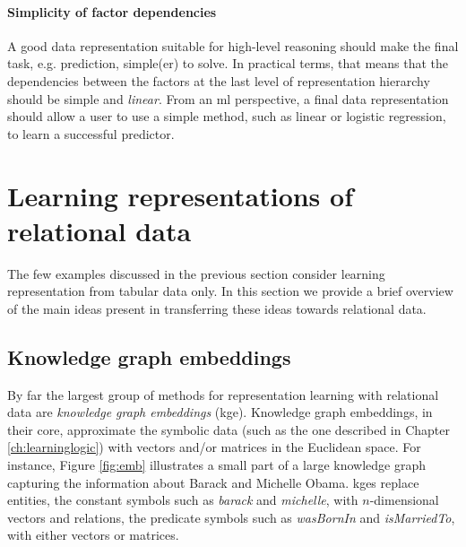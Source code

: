  



\paragraph{\textbf{Simplicity of factor dependencies}}
A good data representation suitable for high-level reasoning should make the final task, e.g. prediction, simple(er) to solve.
In practical terms, that means that the dependencies between the factors at the last level of representation hierarchy should be simple and \textit{linear}.
From an \gls{ml} perspective, a final data representation should allow a user to use a simple method, such as linear or logistic regression, to learn a successful predictor.












\section{Learning representations of relational data}


The few examples discussed in the previous section consider learning representation from tabular data only.
In this section we provide a brief overview of the main ideas present in transferring these ideas towards relational data.


\subsection{Knowledge graph embeddings}


By far the largest group of methods for representation learning with relational data are \textit{knowledge graph embeddings} (\gls{kge}).
Knowledge graph embeddings, in their core, approximate the symbolic data (such as the one described in Chapter \ref{ch:learninglogic}) with vectors and/or matrices in the Euclidean space.
For instance, Figure \ref{fig:emb} illustrates a small part of a large knowledge graph capturing the information about Barack and Michelle Obama.
\gls{kge}s replace entities, the constant symbols such as \textit{barack} and \textit{michelle}, with $n$-dimensional vectors and relations, the predicate symbols such as \textit{wasBornIn} and \textit{isMarriedTo}, with either vectors or matrices.

